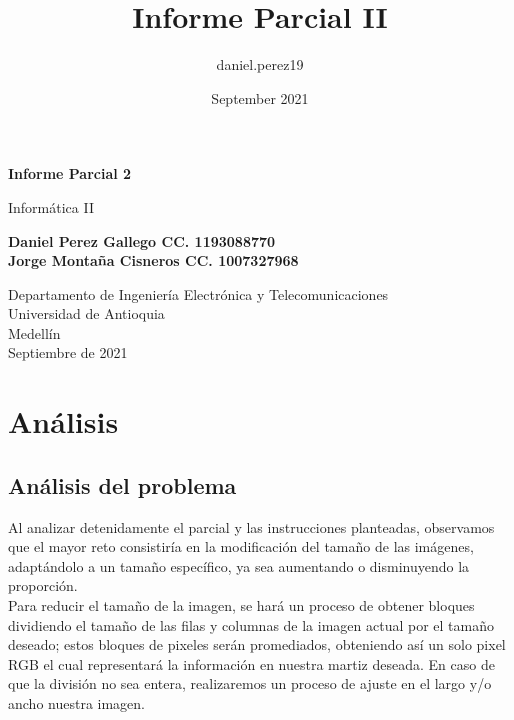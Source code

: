 \documentclass{article}
\title{Informe Parcial II}
\author{daniel.perez19 }
\date{September 2021}
\begin{document}
\begin{titlepage}
    \begin{center}
        \vspace*{1cm}
            
        \Huge
        \textbf{Informe Parcial 2}
            
        \vspace{0.5cm}
        \LARGE
        Informática II
            
        \vspace{1.5cm}
            
        \textbf{Daniel Perez Gallego CC. 1193088770\\Jorge Montaña Cisneros CC.  1007327968}
            
        \vfill
            
        \vspace{0.8cm}
            
        \Large
        Departamento de Ingeniería Electrónica y Telecomunicaciones\\
        Universidad de Antioquia\\
        Medellín\\
        Septiembre de 2021
            
    \end{center}
\end{titlepage}

\tableofcontents
\section{Análisis}
\subsection{Análisis del problema}
Al analizar detenidamente el parcial y las instrucciones planteadas, observamos que el mayor reto consistiría en la modificación del tamaño de las imágenes, adaptándolo a un tamaño específico, ya sea aumentando o disminuyendo la proporción.\\ 

Para reducir el tamaño de la imagen, se hará un proceso de obtener bloques dividiendo el tamaño de las filas y columnas de la imagen actual por el tamaño deseado; estos bloques de pixeles serán promediados, obteniendo así un solo pixel RGB el cual representará la información en nuestra martiz deseada. En caso de que la división no sea entera, realizaremos un proceso de ajuste en el largo y/o ancho nuestra imagen.\\
\end{document}
